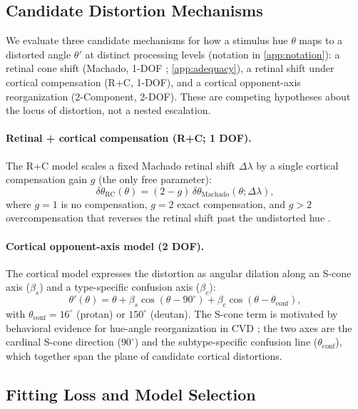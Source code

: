 \documentclass{article}
\begin{document}
\subsection{Candidate Distortion Mechanisms}

We evaluate three candidate mechanisms for how a stimulus hue $\theta$ maps to a distorted angle $\theta'$ at distinct processing levels (notation in \cref{app:notation}): a retinal cone shift (Machado, 1-DOF \citep{machado2009}; \cref{app:adequacy}), a retinal shift under cortical compensation (R+C, 1-DOF), and a cortical opponent-axis reorganization (2-Component, 2-DOF).
These are competing hypotheses about the locus of distortion, not a nested escalation.

\paragraph{Retinal + cortical compensation (R+C; 1 DOF).}
The R+C model scales a fixed Machado retinal shift $\Delta\lambda$ by a single cortical compensation gain $g$ (the only free parameter):
\begin{equation}
\delta\theta_{\text{RC}}(\theta) = (2 - g)\, \delta\theta_{\text{Machado}}(\theta; \Delta\lambda),
\label{eq:rc}
\end{equation}
where $g{=}1$ is no compensation, $g{=}2$ exact compensation, and $g{>}2$ overcompensation that reverses the retinal shift past the undistorted hue \citep{tregillus2021}.

\paragraph{Cortical opponent-axis model (2 DOF).}
The cortical model expresses the distortion as angular dilation along an S-cone axis ($\beta_s$) and a type-specific confusion axis ($\beta_c$):
\begin{equation}
\theta'(\theta) = \theta + \beta_s \cos(\theta - 90^\circ) + \beta_c \cos(\theta - \theta_{\text{conf}}),
\label{eq:2comp}
\end{equation}
with $\theta_{\text{conf}} = 16^\circ$ (protan) or $150^\circ$ (deutan).
The S-cone term is motivated by behavioral evidence for hue-angle reorganization in CVD \citep{emery2021}; the two axes are the cardinal S-cone direction ($90^\circ$) and the subtype-specific confusion line ($\theta_{\text{conf}}$), which together span the plane of candidate cortical distortions.

\subsection{Fitting Loss and Model Selection}
\label{sec:methods_select}
\end{document}

